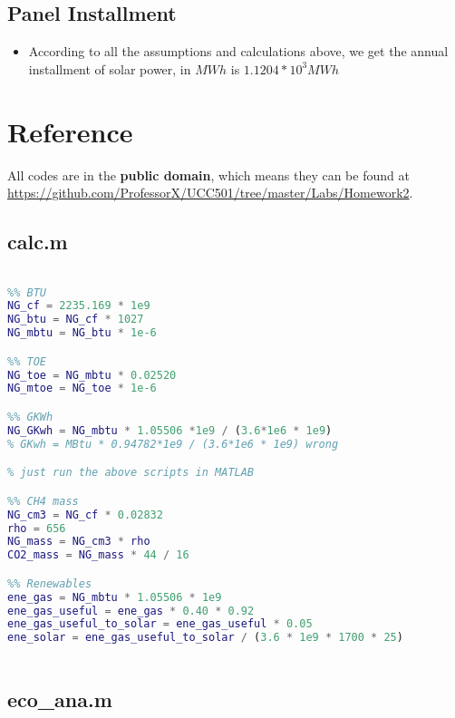 \documentclass[12pt]{article}
\begin{document}
\subsection{Panel Installment}
\label{sec:panel-installment}

\begin{itemize}
\item According to all the assumptions and calculations above, we get
  the annual installment of solar power, in $MWh$ is $1.1204*10^{3}MWh$
\end{itemize}

\section{Reference}
\label{sec:reference}

All codes are in the \textbf{public domain}, which means they can be
found at
\url{https://github.com/ProfessorX/UCC501/tree/master/Labs/Homework2}. 
\subsection{calc.m}
\label{sec:question-1-1}

\begin{lstlisting}[language=Matlab]
% UCC501 HW2 Calc

%% BTU
NG_cf = 2235.169 * 1e9
NG_btu = NG_cf * 1027
NG_mbtu = NG_btu * 1e-6

%% TOE
NG_toe = NG_mbtu * 0.02520
NG_mtoe = NG_toe * 1e-6

%% GKWh
NG_GKwh = NG_mbtu * 1.05506 *1e9 / (3.6*1e6 * 1e9)
% GKwh = MBtu * 0.94782*1e9 / (3.6*1e6 * 1e9) wrong

% just run the above scripts in MATLAB

%% CH4 mass
NG_cm3 = NG_cf * 0.02832
rho = 656
NG_mass = NG_cm3 * rho
CO2_mass = NG_mass * 44 / 16

%% Renewables
ene_gas = NG_mbtu * 1.05506 * 1e9
ene_gas_useful = ene_gas * 0.40 * 0.92
ene_gas_useful_to_solar = ene_gas_useful * 0.05
ene_solar = ene_gas_useful_to_solar / (3.6 * 1e9 * 1700 * 25)



\end{lstlisting}

\subsection{eco\_ana.m}
\label{sec:eco_ana.m}
\end{document}

